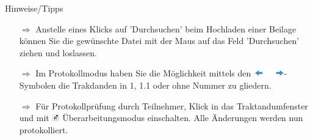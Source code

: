 \documentclass{article}
\begin{document}
\begin{beamerlikethm}{Hinweise/Tipps}
\begin{itemize}
  \item[$\Longrightarrow$] Anstelle eines Klicks auf 'Durchsuchen' beim Hochladen einer Beilage  können Sie die gewünschte Datei mit der Maus auf das Feld 'Durchsuchen' ziehen und loslassen.
  \item[$\Longrightarrow$] Im Protokollmodus haben Sie die Möglichkeit mittels den \includegraphics[height=9pt]{Icons/Pfeil-links-rechts.jpg}-Symbolen die Trakdanden in 1, 1.1 oder ohne Nummer zu gliedern.
	\item[$\Longrightarrow$] Für  Protokollprüfung durch Teilnehmer, Klick in das Traktandumfenster und mit \includegraphics[height=9pt]{Icons/UeberarbModus.jpg} Überarbeitungsmodus einschalten. Alle Änderungen werden nun protokolliert.
\end{itemize}
\end{beamerlikethm}

	
	


\pagebreak


\vspace{\baselineskip}


\end{document}
